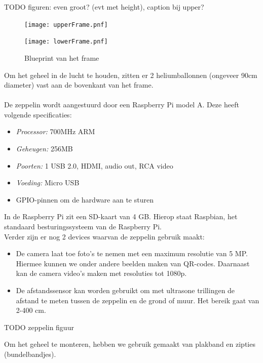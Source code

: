 \documentclass[eind]{penoverslag}
\begin{document}
TODO figuren: even groot? (evt met height), caption bij upper?

\begin{figure}[ht!]
\centering
\texttt{[image: upperFrame.pnf]}
\label{frame}
\end{figure}

\begin{figure}[ht!]
\centering
\texttt{[image: lowerFrame.pnf]}
\caption{Blueprint van het frame}
\label{frame}
\end{figure}

Om het geheel in de lucht te houden, zitten er 2 heliumballonnen (ongeveer 90cm diameter) vast aan de bovenkant van het frame. \\
\\
De zeppelin wordt aangestuurd door een Raspberry Pi model A. Deze heeft volgende specificaties: 
\begin{itemize}
	\item \emph{Processor:} 700MHz ARM
	\item \emph{Geheugen:} 256MB 
	\item \emph{Poorten:} 1 USB 2.0, HDMI, audio out, RCA video
	\item \emph{Voeding:} Micro USB
	\item GPIO-pinnen om de hardware aan te sturen
\end{itemize}

In de Raspberry Pi zit een SD-kaart van 4 GB. Hierop staat Raspbian, het standaard besturingssysteem van de Raspberry Pi. \\

Verder zijn er nog 2 devices waarvan de zeppelin gebruik maakt:
\begin{itemize}
	\item De camera laat toe foto's te nemen met een maximum resolutie van 5 MP. Hiermee kunnen we onder andere beelden maken van QR-codes. Daarnaast kan de camera video's maken met resoluties tot 1080p. 
	\item De afstandssensor kan worden gebruikt om met ultrasone trillingen de afstand te meten tussen de zeppelin en de grond of muur. Het bereik gaat van 2-400 cm. \\
\end{itemize}



TODO zeppelin figuur

Om het geheel te monteren, hebben we gebruik gemaakt van plakband en zipties (bundelbandjes). 
\end{document}
